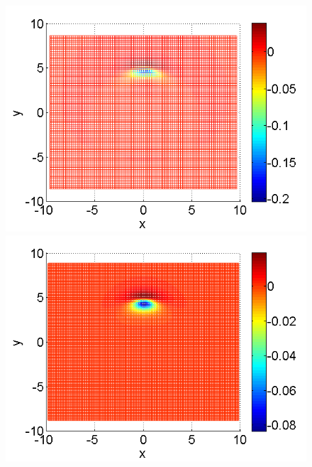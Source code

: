 \documentclass[a4paper]{article}
\theoremstyle{remark}
\begin{document}
\begin{figure}[ht]\vspace{0.4cm}
	\begin{minipage}[b]{0.32\linewidth}
		 \includegraphics[width=\linewidth]{SolutionDiff/TaylorZeroBndVsEnergySave_30_ZB2_bt3_c045_h020_O(h^2).png}
	\end{minipage}	
	\begin{minipage}[b]{0.32\linewidth}
		\includegraphics[width=\linewidth]{SolutionDiff/TaylorZeroBndVsEnergySave_30_ZB2_bt3_c045_h010_O(h^2).png}
	\end{minipage}	
	\begin{minipage}[b]{0.32\linewidth}		

\end{minipage}
\end{figure}
\end{document}
